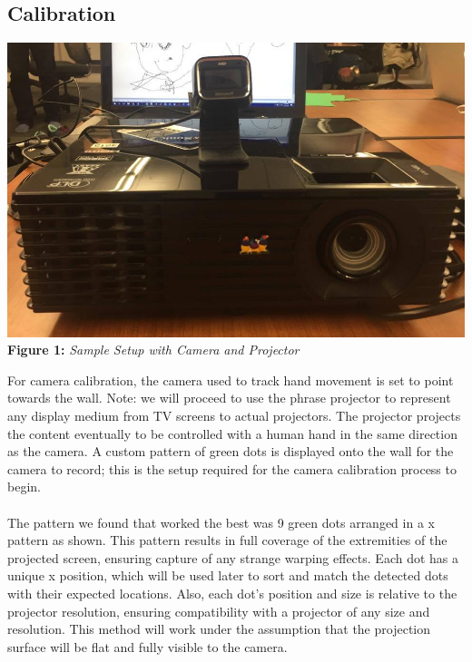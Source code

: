 \documentclass[twoside,twocolumn]{article}
\begin{document}
\subsection{Calibration}

\begin{center}
	\includegraphics[scale=0.19]{setup} \\
	\vspace{0.25cm}
	\small{\textbf{Figure 1:} \textit{Sample Setup with Camera and Projector}}
\end{center}

For camera calibration, the camera used to track hand movement is set to point towards the wall. Note: we will proceed to use the phrase projector to represent any display medium from TV screens to actual projectors. The projector projects the content eventually to be controlled with a human hand in the same direction as the camera. A custom pattern of green dots is displayed onto the wall for the camera to record; this is the setup required for the camera calibration process to begin. \\ \\
The pattern we found that worked the best was 9 green dots arranged in a x pattern as shown. This pattern results in full coverage of the extremities of the projected screen, ensuring capture of any strange warping effects. Each dot has a unique x position, which will be used later to sort and match the detected dots with their expected locations. Also, each dot's position and size is relative to the projector resolution, ensuring compatibility with a projector of any size and resolution. This method will work under the assumption that the projection surface will be flat and fully visible to the camera.
\end{document}
